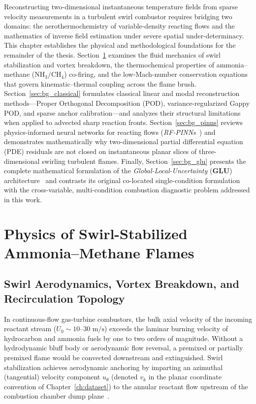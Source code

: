 
Reconstructing two-dimensional instantaneous temperature fields from sparse velocity measurements in a turbulent swirl combustor requires bridging two domains: the aerothermochemistry of variable-density reacting flows and the mathematics of inverse field estimation under severe spatial under-determinacy. This chapter establishes the physical and methodological foundations for the remainder of the thesis. Section~\ref{sec:bg_combustion} examines the fluid mechanics of swirl stabilization and vortex breakdown, the thermochemical properties of ammonia--methane ($\text{NH}_3/\text{CH}_4$) co-firing, and the low-Mach-number conservation equations that govern kinematic--thermal coupling across the flame brush. Section~\ref{sec:bg_classical} formulates classical linear and modal reconstruction methods---Proper Orthogonal Decomposition (POD), variance-regularized Gappy POD, and sparse anchor calibration---and analyzes their structural limitations when applied to advected sharp reaction fronts. Section~\ref{sec:bg_pinns} reviews physics-informed neural networks for reacting flows (\textit{RF-PINNs}~\cite{yadav2025rfpinns}) and demonstrates mathematically why two-dimensional partial differential equation (PDE) residuals are not closed on instantaneous planar slices of three-dimensional swirling turbulent flames. Finally, Section~\ref{sec:bg_glu} presents the complete mathematical formulation of the \textit{Global-Local-Uncertainty} (\textbf{GLU}) architecture~\cite{wang2026glu} and contrasts its original co-located single-condition formulation with the cross-variable, multi-condition combustion diagnostic problem addressed in this work.

\section{Physics of Swirl-Stabilized Ammonia--Methane Flames}
\label{sec:bg_combustion}

\subsection{Swirl Aerodynamics, Vortex Breakdown, and Recirculation Topology}
\label{subsec:bg_swirl}

In continuous-flow gas-turbine combustors, the bulk axial velocity of the incoming reactant stream ($U_0 \sim 10\text{--}30\text{ m/s}$) exceeds the laminar burning velocity of hydrocarbon and ammonia fuels by one to two orders of magnitude. Without a hydrodynamic bluff body or aerodynamic flow reversal, a premixed or partially premixed flame would be convected downstream and extinguished. Swirl stabilization achieves aerodynamic anchoring by imparting an azimuthal (tangential) velocity component $u_\theta$ (denoted $v_k$ in the planar coordinate convention of Chapter~\ref{ch:dataset}) to the annular reactant flow upstream of the combustion chamber dump plane~\cite{syred1974combustion, lilley1977swirl, candel2014dynamics}.

